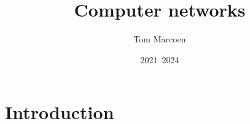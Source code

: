 \title{Computer networks}
\def\subtitle{A brief introduction}
\author{Tom Marcoen}
\date{2021--2024}






   

   \frontmatter
   \clearforchapter
   \tableofcontents*
   \clearforchapter
   \listoffigures
   \clearforchapter
   \listoftables
   
   \printglossary[type=abbreviations,style=mcolindexgroup]
   
   \mainmatter

   \chapter{Introduction}

